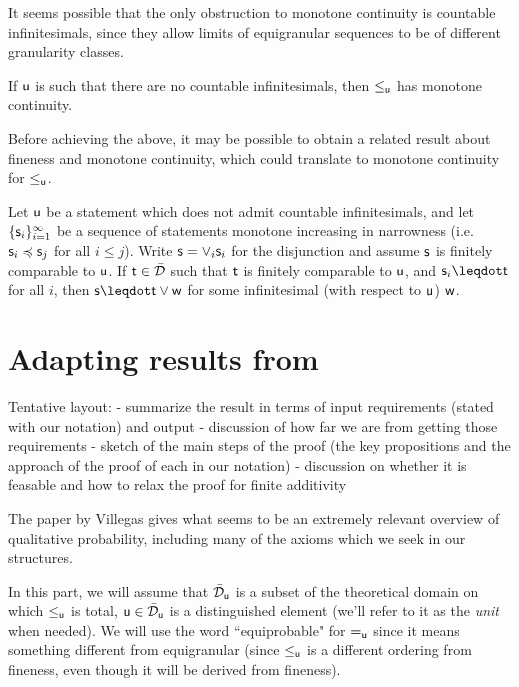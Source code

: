 \documentclass[10pt, onecolumn, longbibliography, nofootinbib]{revtex4-2}
\begin{document}
It seems possible that the only obstruction to monotone continuity is countable infinitesimals, since they allow limits of equigranular sequences to be of different granularity classes. 

\begin{desid}
    If $\stmt[u]$ is such that there are no countable infinitesimals, then $\lequ$ has monotone continuity. 
\end{desid}

Before achieving the above, it may be possible to obtain a related result about fineness and monotone continuity, which could translate to monotone continuity for $\lequ$. 


\begin{desid}
Let $\stmt[u]$ be a statement which does not admit countable infinitesimals, and let $\{\stmt_i\}_{i=1}^{\infty}$ be a sequence of statements monotone increasing in narrowness (i.e. $\stmt_i\narrower\stmt_j$ for all $i\leq j$). Write $\stmt=\OR_i\stmt_i$ for the disjunction and assume $\stmt$ is finitely comparable to $\stmt[u]$. If $\stmt[t]\in\tdomain$ such that $\stmt[t]$ is finitely comparable to $\stmt[u]$, and $\stmt_i\finer\stmt[t]$ for all $i$, then $\stmt\finer\stmt[t]\OR\stmt[w]$ for some infinitesimal (with respect to $\stmt[u]$) $\stmt[w]$. 
\end{desid}



\section{Adapting results from \cite{villegas}}

Tentative layout:
- summarize the result in terms of input requirements (stated with our notation) and output
- discussion of how far we are from getting those requirements
- sketch of the main steps of the proof (the key propositions and the approach of the proof of each in our notation)
- discussion on whether it is feasable and how to relax the proof for finite additivity

The paper \cite{villegas} by Villegas gives what seems to be an extremely relevant overview of qualitative probability, including many of the axioms which we seek in our structures. 

In this part, we will assume that $\tdomain_{\stmt[u]}$ is a subset of the theoretical domain on which $\lequ$ is total, $\stmt[u]\in \tdomain_{\stmt[u]}$ is a distinguished element (we'll refer to it as the \emph{unit} when needed). We will use the word ``equiprobable" for $=_{\stmt[u]}$ since it means something different from equigranular (since $\leq_{\stmt[u]}$ is a different ordering from fineness, even though it will be derived from fineness). 
\end{document}
